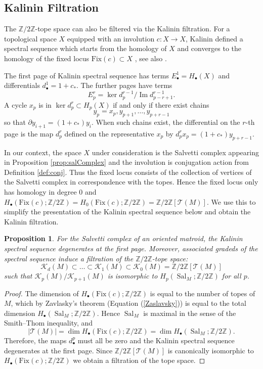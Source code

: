\documentclass{amsart}
\newtheorem{proposition}[theorem]{Proposition}
\newcommand\Kcal{{\mathcal K}}
\newcommand\Tcal{{\mathcal T}}
\newcommand\Ztwo{{\mathbb Z}/2{\mathbb Z}}
\DeclareMathOperator{\Image}{Im}
\DeclareMathOperator{\Sal}{Sal}
\begin{document}
{\subsection{Kalinin Filtration} \label{sec:Kalinin}

The $\Ztwo$-tope space can also be filtered via the Kalinin filtration. 
For a topological space $X$ equipped with an involution $c : X \to X$, Kalinin defined a spectral sequence which starts from the homology of $X$ and converges to the homology of the fixed locus $\text{Fix}(c) \subset X$ \cite{Kalinin}, see also \cite{Degtyarev}. 

The first page of Kalinin spectral sequence has terms $E^1_{\bullet} = H_{\bullet}(X)$ and differentials $d^1_{\bullet} = 1 + c_*$.
The further pages have terms $$E^{r}_{p} = \ker d^{r-1}_p / \Image d^{r-1}_{p-r+1}.$$
A cycle $x_p$ is in $\ker d^r_p \subset H_p(X)$ if and only if there exist chains $$y_p =x_p, y_{p+1} , \dots, y_{p+r-1} $$ so that $\partial y_{i+1} = (1+c_*) y_i. $ When such chains exist, the differential on the $r$-th page is the map $d^r_{p}$ defined on the representative $x_p$ by $d_p^r x_p = (1 + c_*) y_{p+r-1}$.

In our context, the space $X$ under consideration is the Salvetti complex appearing in Proposition \ref{prop:salComplex} and the involution is conjugation action from Definition \ref{def:conj}. Thus the fixed locus consists of the collection of vertices of the Salvetti complex in correspondence with the topes. Hence the fixed locus only has homology in degree $0$ and $H_{\bullet}(\text{Fix}(c); \Ztwo) = H_{0}(\text{Fix}(c); \Ztwo) = \Ztwo[\mathcal{T}(M)]$. We use this to simplify the presentation of the Kalinin spectral sequence below and obtain the Kalinin filtration. 

\begin{proposition}\label{prop:Kalinin}
For the Salvetti complex of an oriented matroid, the Kalinin spectral sequence degenerates at the first page. Moreover, associated gradeds of the spectral sequence induce a filtration of the $\Ztwo$-tope space: 
$$\Kcal_d(M) \subset \dots \subset \Kcal_1(M) \subset \Kcal_0(M) = \Ztwo[\Tcal(M)]$$ such that $\Kcal_p(M) / \Kcal_{p+1}(M)$ is isomorphic to $H_p(\Sal_M; \Ztwo)$ for all $p$.
\end{proposition}

\begin{proof}
The dimension of $H_{\bullet}(\text{Fix}(c); \Ztwo)$ is equal to the number of topes of $M$, which by Zavlasky's theorem (Equation (\ref{Zaslavsky})) is equal to the total dimension $H_{\bullet}(\Sal_M; \Ztwo)$.
Hence $\Sal_M$ is maximal in the sense of the Smith--Thom inequality, and 
\[ |\Tcal(M)| = \dim H_{\bullet}(\text{Fix}(c); \Ztwo) = \dim  H_{\bullet}(\Sal_M; \Ztwo). \]
Therefore, the maps $d_{\bullet}^p$ must all be zero and the Kalinin spectral sequence degenerates at the first
page. 
Since $\Ztwo[\Tcal(M)]$ is canonically isomorphic to $H_{\bullet}(\text{Fix}(c); \Ztwo)$ we obtain a filtration of the tope space. 
\end{proof}

}
\end{document}
